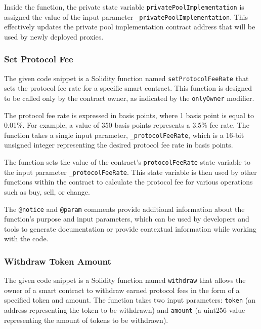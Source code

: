 Inside the function, the private state variable
\texttt{privatePoolImplementation} is assigned the value of the input
parameter \texttt{\_privatePoolImplementation}. This effectively updates
the private pool implementation contract address that will be used by
newly deployed proxies.

\hypertarget{set-protocol-fee}{%
\subsubsection{Set Protocol Fee}\label{set-protocol-fee}}

The given code snippet is a Solidity function named
\texttt{setProtocolFeeRate} that sets the protocol fee rate for a
specific smart contract. This function is designed to be called only by
the contract owner, as indicated by the \texttt{onlyOwner} modifier.

The protocol fee rate is expressed in basis points, where 1 basis point
is equal to 0.01\%. For example, a value of 350 basis points represents
a 3.5\% fee rate. The function takes a single input parameter,
\texttt{\_protocolFeeRate}, which is a 16-bit unsigned integer
representing the desired protocol fee rate in basis points.

The function sets the value of the contract's \texttt{protocolFeeRate}
state variable to the input parameter \texttt{\_protocolFeeRate}. This
state variable is then used by other functions within the contract to
calculate the protocol fee for various operations such as buy, sell, or
change.

The \texttt{@notice} and \texttt{@param} comments provide additional
information about the function's purpose and input parameters, which can
be used by developers and tools to generate documentation or provide
contextual information while working with the code.

\hypertarget{withdraw-token-amount}{%
\subsubsection{Withdraw Token Amount}\label{withdraw-token-amount}}

The given code snippet is a Solidity function named \texttt{withdraw}
that allows the owner of a smart contract to withdraw earned protocol
fees in the form of a specified token and amount. The function takes two
input parameters: \texttt{token} (an address representing the token to
be withdrawn) and \texttt{amount} (a uint256 value representing the
amount of tokens to be withdrawn).

